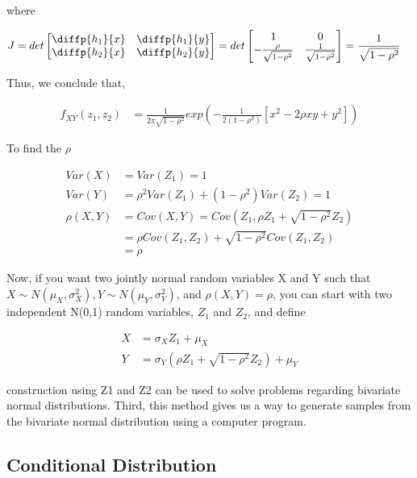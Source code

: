 where 

\begin{align*}
	J &= det \begin{bmatrix}
		\diffp{h_1}{x} & \diffp{h_1}{y} \\
		\diffp{h_2}{x} & \diffp{h_2}{y}
	\end{bmatrix} = det \begin{bmatrix}
	1 & 0 \\
	-\frac{\rho}{\sqrt{1-\rho^2}} & \frac{1}{\sqrt{1-\rho^2}}
\end{bmatrix} = \frac{1}{\sqrt{1-\rho^2}}
\end{align*}

Thus, we conclude that,

\begin{align*}
	f_{XY}(z_1, z_2) &= \frac{1}{2 \pi \sqrt{1-\rho^2}} exp \left( -\frac{1}{2 (1- \rho^2)} [x^2 -2 \rho xy + y^2] \right)
\end{align*}


To find the $\rho$

\begin{align*}
	Var(X) &= Var(Z_1) =1 \\
	Var(Y) &= \rho^2 Var(Z_1) + (1- \rho^2) Var(Z_2) = 1 \\
	\rho(X,Y) &= Cov(X, Y) = Cov(Z_1, \rho Z_1 + \sqrt{1-\rho^2} Z_2) \\
	&= \rho Cov(Z_1, Z_2) + \sqrt{1-\rho^2} Cov(Z_1, Z_2) \\
	&= \rho
\end{align*}

Now, if you want two jointly normal random variables X and Y such that $X \sim N(\mu_X, \sigma^2_X), Y \sim N(\mu_Y, \sigma^2_Y)$, and $\rho(X,Y)= \rho$, you can start with two independent N(0,1) random variables, $Z_1$ and $Z_2$, and define

\begin{align*}
	X &= \sigma_X Z_1 + \mu_X \\
	Y &= \sigma_Y \left(\rho Z_1 + \sqrt{1-\rho^2} Z_2 \right)  + \mu_Y
\end{align*}

construction using Z1 and Z2 can be used to solve problems regarding bivariate normal distributions. Third, this method gives us a way to generate samples from the bivariate normal distribution using a computer program. 

\subsection{Conditional Distribution}

